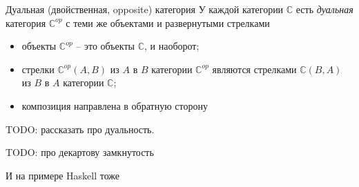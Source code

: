 \documentclass[
  russian,
  aspectratio=169,
  xcolor={svgnames},
  hyperref={colorlinks,citecolor=DeepPink4,linkcolor=DarkRed,urlcolor=DarkBlue}]{beamer}
\begin{document}
\begin{frame}[fragile]{Дуальная (двойственная, opposite) категория}
У каждой категории $\mathbb{C}$ есть \emph{дуальная} категория $\mathbb{C}^{op}$ с теми же объектами и развернутыми стрелками
\begin{itemize}
 \item объекты $\mathbb{C}^{op}$ -- это объекты $\mathbb{C}$, и наоборот;
 \item стрелки $\mathbb{C}^{op}(A,B)$ из $A$ в $B$ категории $\mathbb{C}^{op}$
 являются стрелками $\mathbb{C}(B,A)$ из $B$ в $A$ категории $\mathbb{C}$;
 \item композиция направлена в обратную сторону
\end{itemize}

\vspace{1cm}

TODO: рассказать про дуальность.
\end{frame}
% 
% 

\begin{frame}[fragile]{TODO: про декартову замкнутость}

 И на примере Haskell тоже
 
\end{frame}
\end{document}
